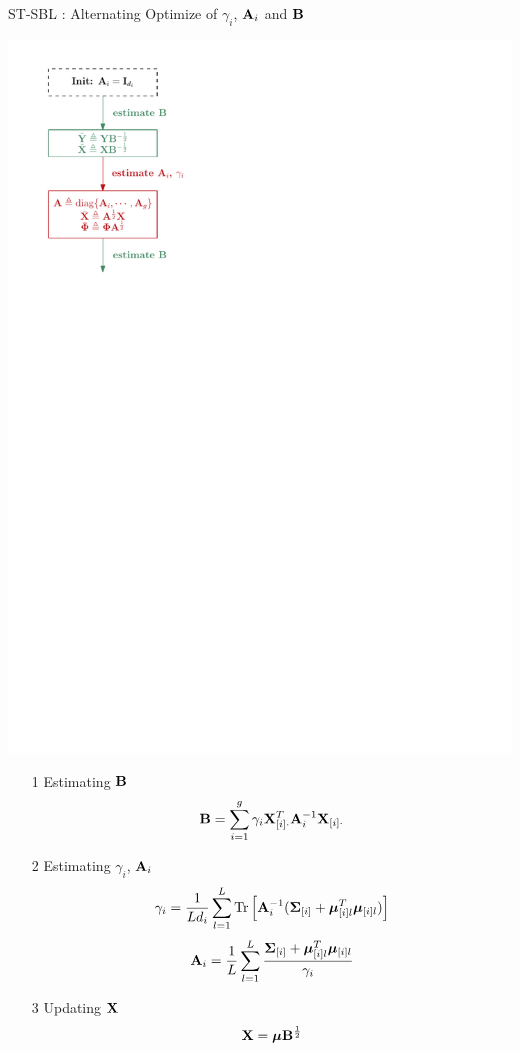 \documentclass[notheorems,table]{beamer}
\begin{document}
\begin{frame}{ST-SBL : Alternating Optimize of $\gamma_i$, $\mathbf{A}_i$ and $\mathbf{B}$}
    
    \begin{minipage}{.39\linewidth}
        {\centering\includegraphics[width=\linewidth]{st-sbl_alternate}}
    \end{minipage}
    \begin{minipage}{.60\linewidth}
        \begin{itemize}
            \item[1] Estimating $\mathbf{B}$
                \[
                    \mathbf{B} = \sum_{i=1}^g \gamma_i \mathbf{X}_{[i]\cdot}^T\mathbf{A}_i^{-1}\mathbf{X}_{[i]\cdot}
                \]
            \item[2] Estimating $\gamma_i$, $\mathbf{A}_i$
                \[
                    \gamma_i = \frac{1}{Ld_i} \sum_{l=1}^L \mathrm{Tr}\left[\mathbf{A}_i^{-1}(\bm{\Sigma}_{[i]} + \bm{\mu}_{[i]l}^T\bm{\mu}_{[i]l})\right]
                \]
                \[
                    \mathbf{A}_i = \frac{1}{L} \sum_{l=1}^L \frac{\bm{\Sigma}_{[i]} + \bm{\mu}_{[i]l}^T\bm{\mu}_{[i]l}}{\gamma_i}
                \]
            \item[3] Updating $\mathbf{X}$
                \[
                    \mathbf{X} = \bm{\mu}\mathbf{B}^{\frac{1}{2}}
                \]
        \end{itemize}
    \end{minipage}

\end{frame}
\end{document}
